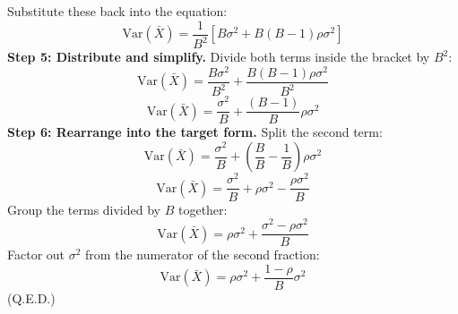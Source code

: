 \documentclass[twoside, 10pt]{article}
\begin{document}
Substitute these back into the equation:
\[
\text{Var}(\bar{X}) = \frac{1}{B^2} \left[ B\sigma^2 + B(B-1)\rho\sigma^2 \right]
\]
\textbf{Step 5: Distribute and simplify.}
Divide both terms inside the bracket by $B^2$:
\[
\text{Var}(\bar{X}) = \frac{B\sigma^2}{B^2} + \frac{B(B-1)\rho\sigma^2}{B^2}
\]
\[
\text{Var}(\bar{X}) = \frac{\sigma^2}{B} + \frac{(B-1)}{B}\rho\sigma^2
\]
\textbf{Step 6: Rearrange into the target form.}
Split the second term:
\[
\text{Var}(\bar{X}) = \frac{\sigma^2}{B} + \left(\frac{B}{B} - \frac{1}{B}\right)\rho\sigma^2
\]
\[
\text{Var}(\bar{X}) = \frac{\sigma^2}{B} + \rho\sigma^2 - \frac{\rho\sigma^2}{B}
\]
Group the terms divided by $B$ together:
\[
\text{Var}(\bar{X}) = \rho\sigma^2 + \frac{\sigma^2 - \rho\sigma^2}{B}
\]
Factor out $\sigma^2$ from the numerator of the second fraction:
\[
\text{Var}(\bar{X}) = \rho\sigma^2 + \frac{1 - \rho}{B}\sigma^2
\]
\hfill (Q.E.D.)
\end{document}

